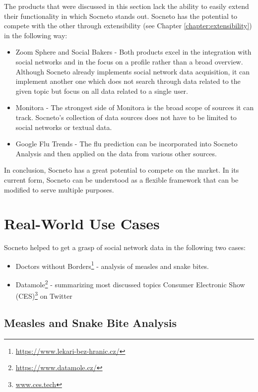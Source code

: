 The products that were discussed in this section lack the ability to easily extend their functionality in which Socneto stands out. Socneto has the potential to compete with the other through extensibility (see Chapter \ref{chapter:extensibility}) in the following way:

\begin{itemize}
    \item Zoom Sphere and Social Bakers - Both products excel in the integration with social networks and in the focus on a profile rather than a broad overview. Although Socneto already implements social network data acquisition, it can implement another one which does not search through data related to the given topic but focus on all data related to a single user.
    \item Monitora - The strongest side of Monitora is the broad scope of sources it can track. Socneto's collection of data sources does not have to be limited to social networks or textual data.
    \item Google Flu Trends - The flu prediction can be incorporated into Socneto Analysis and then applied on the data from various other sources.
\end{itemize}

In conclusion, Socneto has a great potential to compete on the market. In its current form, Socneto can be understood as a flexible framework that can be modified to serve multiple purposes.  

\section{Real-World Use Cases}\label{section:realuc}

Socneto helped to get a grasp of social network data in the following two cases:

\begin{itemize}
    \item Doctors without Borders\footnote{\url{https://www.lekari-bez-hranic.cz/}} - analysis of measles and snake bites.
    \item Datamole\footnote{\url{https://www.datamole.cz/}} - summarizing most discussed topics Consumer Electronic Show (CES)\footnote{\url{www.ces.tech}} on Twitter
\end{itemize}

\subsection{Measles and Snake Bite Analysis}


